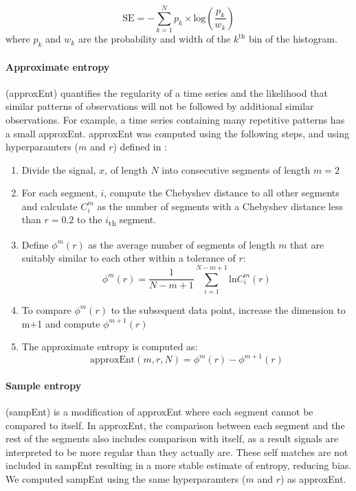 \documentclass[fleqn,10pt]{wlscirep}
\begin{document}
\begin{equation}
	\text{SE} = - \sum_{k=1}^{N} p_k \times \text{log}(\frac{p_k}{w_k})
	\label{eqn:shannon_ent}
\end{equation}
where $p_k$ and $w_k$ are the probability and width of the $k^{\text{th}}$ bin of the histogram.

\paragraph{Approximate entropy}
(approxEnt) quantifies the regularity of a time series and the likelihood that similar patterns of observations will not be followed by additional similar observations. For example, a time series containing many repetitive patterns has a small approxEnt. approxEnt was computed using the following steps, and using hyperparamters ($m$ and $r$) defined in \cite{Li2016}:

\begin{enumerate}
\setlength\itemsep{0em}
\item Divide the signal, $x$, of length $N$ into consecutive segments of length $m = 2$
    \item For each segment, $i$, compute the Chebyshev distance to all other segments and calculate $C^{m}_i$ as the number of segments with a Chebyshev distance less than $r = 0.2$ to the $i$\textsubscript{th} segment. 
    \item Define $\phi^{m}(r)$ as the average number of segments of length $m$ that are suitably similar to each other within a tolerance of $r$:
    \begin{equation}
        \phi^{m}(r) = \frac{1}{N-m+1}\sum_{i=1}^{N-m+1}\text{ln}C^{m}_i(r)
    \end{equation}

    \item To compare $\phi^{m}(r)$ to the subsequent data point, increase the dimension to m+1 and compute $\phi^{m+1}(r)$
    \item The approximate entropy is computed as:
    \begin{equation}
        \text{approxEnt}(m, r, N) = \phi^{m}(r) - \phi^{m+1}(r)
        \label{eqn:apprx_ent}
    \end{equation}
\end{enumerate}


\paragraph{Sample entropy}
(sampEnt) is a modification of approxEnt where each segment cannot be compared to itself. In approxEnt, the comparison between each segment and the rest of the segments also includes comparison with itself, as a result signals are interpreted to be more regular than they actually are. These self matches are not included in sampEnt resulting in a more stable estimate of entropy, reducing bias. We computed sampEnt using the same hyperparamters ($m$ and $r$) as approxEnt.
\end{document}
